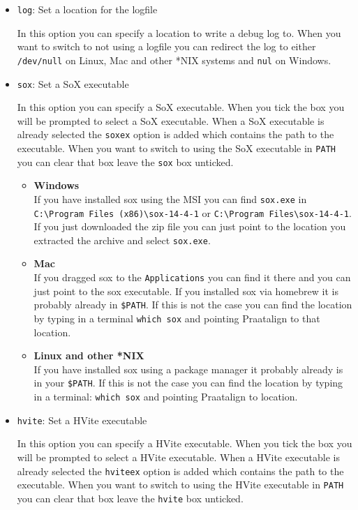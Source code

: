 \begin{itemize}
	\item \texttt{log}: %
		Set a location for the logfile

		In this option you can specify a location to write a debug log to. When you
		want to switch to not using a logfile you can redirect the log to either
		\texttt{/dev/null} on Linux, Mac and other *NIX systems and \texttt{nul} on
		Windows.
	\item \texttt{sox}: %
		Set a SoX executable

		In this option you can specify a SoX executable. When you tick the box you
		will be prompted to select a SoX executable. When a SoX executable is
		already selected the \texttt{soxex} option is added which contains the path
		to the executable. When you want to switch to using the SoX executable in
		\texttt{PATH} you can clear that box leave the \texttt{sox} box unticked.

		\begin{itemize}
			\item \textbf{Windows}\\
				If you have installed sox using the MSI you can find \texttt{sox.exe}
				in \texttt{
				C:\textbackslash Program Files (x86)\textbackslash sox-14-4-1} or
				\texttt{C:\textbackslash Program Files\textbackslash sox-14-4-1}.
				If you just downloaded the zip file you can just point to the location
				you extracted the archive and select \texttt{sox.exe}.
			\item \textbf{Mac}\\
				If you dragged sox to the \texttt{Applications} you can find it there
				and you can just point to the sox executable. If you installed sox via
				homebrew it is probably already in \texttt{\$PATH}. If this is not the
				case you can find the location by typing in a terminal \texttt{which
				sox} and pointing Praatalign to that location.
			\item \textbf{Linux and other *NIX}\\
				If you have installed sox using a package manager it probably already
				is in your \texttt{\$PATH}. If this is not the case you can find the
				location by typing in a terminal: \texttt{which sox} and pointing
				Praatalign to location.
		\end{itemize}
	\item \texttt{hvite}: %
		Set a HVite executable

		In this option you can specify a HVite executable. When you tick the box you
		will be prompted to select a HVite executable. When a HVite executable is
		already selected the \texttt{hviteex} option is added which contains the
		path to the executable. When you want to switch to using the HVite
		executable in \texttt{PATH} you can clear that box leave the \texttt{hvite}
		box unticked.


\end{itemize}
